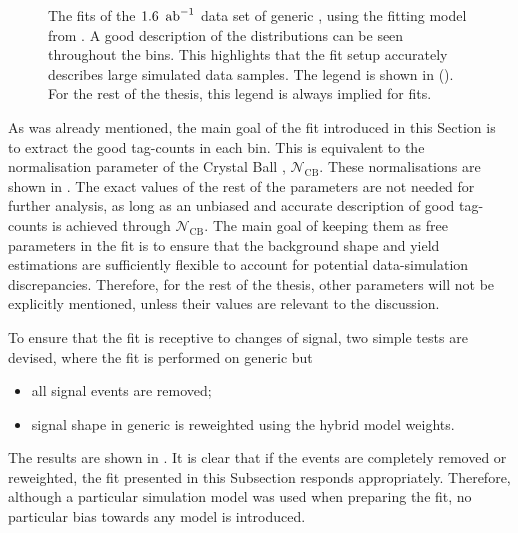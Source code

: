 \begin{figure}[hbtp!]
{    }
    \caption{\label{fig:primary_full_fits}The fits of the $1.6~\mbox{\,ab}^{-1}$ data set of generic \MC, using the fitting model from .
    A good description of the \Mbc distributions can be seen throughout the \EB bins.
    This highlights that the fit setup accurately describes large simulated data samples.
    The legend is shown in ().
    For the rest of the thesis, this legend is always implied for \Mbc fits.
    }
\end{figure}

As was already mentioned, the main goal of the \Mbc fit introduced in this Section is to extract the good tag-\B counts in each \EB bin.
This is equivalent to the normalisation parameter of the Crystal Ball \PDF, $\mathcal{N}_{\mathrm{CB}}$.
These normalisations are shown in .
The exact values of the rest of the parameters are not needed for further analysis, as long as an unbiased and accurate description of good tag-\B counts is achieved through $\mathcal{N}_{\mathrm{CB}}$.
The main goal of keeping them as free parameters in the fit is to ensure that the \Mbc background shape and yield estimations are sufficiently flexible to account for potential data-simulation discrepancies.
Therefore, for the rest of the thesis, other parameters will not be explicitly mentioned, unless their values are relevant to the discussion.

To ensure that the fit is receptive to changes of \BtoXsgamma signal, two simple tests are devised, where the fit is performed on generic \MC but
\begin{itemize}
    \item all \BtoXsgamma signal events are removed;
    \item \BtoXsgamma signal shape in generic \MC is reweighted using the hybrid model weights.
\end{itemize}
The results are shown in .
It is clear that if the \BtoXsgamma events are completely removed or reweighted, the \Mbc fit presented in this Subsection responds appropriately.
Therefore, although a particular simulation model was used when preparing the fit, no particular bias towards any \BtoXsgamma model is introduced.

